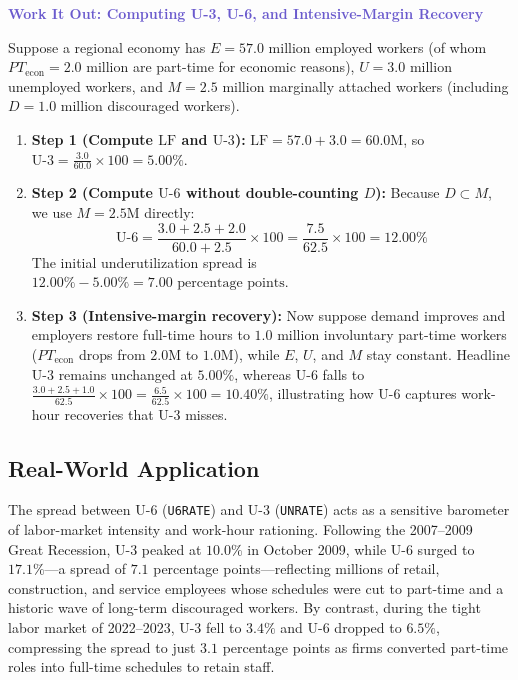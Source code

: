 \documentclass[11pt, a4paper]{article}
\newcommand{\boxheader}[2]{\textbf{\textcolor{#1}{#2}}\par\smallskip}
\begin{document}
\begin{casestudy}
\boxheader{SlateBlue}{Work It Out: Computing U-3, U-6, and Intensive-Margin Recovery}
Suppose a regional economy has $E = 57.0\text{ million}$ employed workers (of whom $PT_{\text{econ}} = 2.0\text{ million}$ are part-time for economic reasons), $U = 3.0\text{ million}$ unemployed workers, and $M = 2.5\text{ million}$ marginally attached workers (including $D = 1.0\text{ million}$ discouraged workers).
\begin{enumerate}[leftmargin=1.5em, itemsep=2pt, topsep=3pt]
  \item \textbf{Step 1 (Compute $\text{LF}$ and $\text{U-3}$):} $\text{LF} = 57.0 + 3.0 = 60.0\text{M}$, so $\text{U-3} = \frac{3.0}{60.0} \times 100 = 5.00\%$.
  \item \textbf{Step 2 (Compute $\text{U-6}$ without double-counting $D$):} Because $D \subset M$, we use $M = 2.5\text{M}$ directly:
  \[
    \text{U-6} = \frac{3.0 + 2.5 + 2.0}{60.0 + 2.5} \times 100 = \frac{7.5}{62.5} \times 100 = 12.00\%
  \]
  The initial underutilization spread is $12.00\% - 5.00\% = 7.00\text{ percentage points}$.
  \item \textbf{Step 3 (Intensive-margin recovery):} Now suppose demand improves and employers restore full-time hours to $1.0\text{ million}$ involuntary part-time workers ($PT_{\text{econ}}$ drops from $2.0\text{M}$ to $1.0\text{M}$), while $E$, $U$, and $M$ stay constant. Headline $\text{U-3}$ remains unchanged at $5.00\%$, whereas $\text{U-6}$ falls to $\frac{3.0 + 2.5 + 1.0}{62.5} \times 100 = \frac{6.5}{62.5} \times 100 = 10.40\%$, illustrating how U-6 captures work-hour recoveries that U-3 misses.
\end{enumerate}
\end{casestudy}

\subsection*{Real-World Application}
The spread between U-6 (\texttt{U6RATE}) and U-3 (\texttt{UNRATE}) acts as a sensitive barometer of labor-market intensity and work-hour rationing. Following the 2007--2009 Great Recession, U-3 peaked at $10.0\%$ in October 2009, while U-6 surged to $17.1\%$—a spread of $7.1$ percentage points—reflecting millions of retail, construction, and service employees whose schedules were cut to part-time and a historic wave of long-term discouraged workers. By contrast, during the tight labor market of 2022--2023, U-3 fell to $3.4\%$ and U-6 dropped to $6.5\%$, compressing the spread to just $3.1$ percentage points as firms converted part-time roles into full-time schedules to retain staff.
\end{document}
